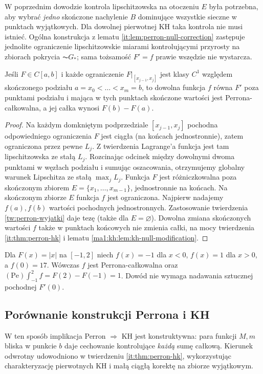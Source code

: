 \begin{uwaga}
W poprzednim dowodzie kontrola lipschitzowska na otoczeniu $E$ była potrzebna, aby wybrać \emph{jedno} skończone nachylenie $B$ dominujące wszystkie sieczne w punktach wyjątkowych. Dla dowolnej pierwotnej KH taka kontrola nie musi istnieć. Ogólna konstrukcja z lematu \ref{it:lem:perron-null-correction} zastępuje jednolite ograniczenie lipschitzowskie miarami kontrolującymi przyrosty na zbiorach pokrycia $\AC G_*$; sama tożsamość $F'=f$ prawie wszędzie nie wystarcza.
\end{uwaga}
\begin{wniosek}\label{wn:perron-kawalkami}
Jeśli $F\in C[a,b]$ i każde ograniczenie $F|_{[x_{j-1},x_j]}$ jest klasy $C^1$ względem skończonego podziału $a=x_0<\dots<x_m=b$, to dowolna funkcja $f$ równa $F'$ poza punktami podziału i mająca w tych punktach skończone wartości jest Perrona-całkowalna, a jej całka wynosi $F(b)-F(a)$.
\end{wniosek}
\begin{proof}
Na każdym domkniętym podprzedziale $[x_{j-1},x_j]$ pochodna odpowiedniego ograniczenia $F$ jest ciągła (na końcach jednostronnie), zatem ograniczona przez pewne $L_j$. Z twierdzenia Lagrange'a funkcja jest tam lipschitzowska ze stałą $L_j$. Rozcinając odcinek między dowolnymi dwoma punktami w węzłach podziału i sumując oszacowania, otrzymujemy globalny warunek Lipschitza ze stałą $\max_j L_j$. Funkcja $F$ jest różniczkowalna poza skończonym zbiorem $E=\{x_1,\ldots,x_{m-1}\}$, jednostronnie na końcach. Na skończonym zbiorze $E$ funkcja $f$ jest ograniczona. Najpierw nadajemy $f(a),f(b)$ wartości pochodnych jednostronnych. Zastosowanie twierdzenia \ref{tw:perron-wyjatki} daje tezę (także dla $E=\varnothing$). Dowolna zmiana skończonych wartości $f$ także w punktach końcowych nie zmienia całki, na mocy twierdzenia \ref{it:thm:perron-hk} i lematu \ref{ma1:kh:lem:kh-null-modification}.
\end{proof}
\begin{przyklad}
Dla $F(x)=|x|$ na $[-1,2]$ niech $f(x)=-1$ dla $x<0$, $f(x)=1$ dla $x>0$, a $f(0)=17$. Wówczas $f$ jest Perrona-całkowalna oraz $(\mathrm{Pe})\int_{-1}^{2}f=F(2)-F(-1)=1$. Dowód nie wymaga nadawania sztucznej pochodnej $F'(0)$.
\end{przyklad}
\subsection*{Porównanie konstrukcji Perrona i KH}

W ten sposób implikacja Perron $\Rightarrow$ KH jest konstruktywna: para funkcji $M,m$ bliska w punkcie $b$ daje cechowanie kontrolujące \emph{każdą} sumę całkową. Kierunek odwrotny udowodniono w twierdzeniu \ref{it:thm:perron-hk}, wykorzystując charakteryzację pierwotnych KH i małą ciągłą korektę na zbiorze wyjątkowym.


\endgroup
